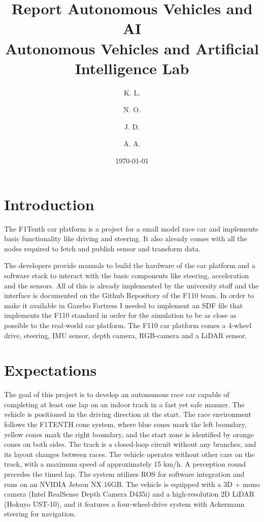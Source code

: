 \documentclass[a4paper,11pt]{article}
\title{Report Autonomous Vehicles and AI\\[1ex]
%
\large Autonomous Vehicles and Artificial Intelligence Lab}
\author{
    K. L. \\
    \and
    N. O. \\
    \and
    J. D. \\
    \and
    A. A.
}
\date{\today}
\begin{document}
\maketitle

\section{Introduction}

The F1Tenth car platform is a project for a small model race car and implements basic functionality like driving and steering. 
It also already comes with all the nodes required to fetch and publish sensor and transform data.

The developers provide manuals to build the hardware of the car platform and a software stack to interact with the basic components like steering, acceleration and the sensors. All of this is already implemented by the university staff and the interface is documented on the Github Repository of the F110 team.
In order to make it available in Gazebo Fortress I needed to implement an SDF file that implements the F110 standard in order for the simulation to be as close as possible to the real-world car platform.
The F110 car platform comes a 4-wheel drive, steering, IMU sensor, depth camera, RGB-camera and a LiDAR sensor.

\section{Expectations}

The goal of this project is to develop an autonomous race car capable of completing at least one lap on an indoor track in a fast yet safe manner. The vehicle is positioned in the driving direction at the start. The race environment follows the F1TENTH cone system, where blue cones mark the left boundary, yellow cones mark the right boundary, and the start zone is identified by orange cones on both sides. The track is a closed-loop circuit without any branches, and its layout changes between races. The vehicle operates without other cars on the track, with a maximum speed of approximately 15 km/h. A perception round precedes the timed lap. The system utilizes ROS for software integration and runs on an NVIDIA Jetson NX 16GB. The vehicle is equipped with a 3D + mono camera (Intel RealSense Depth Camera D435i) and a high-resolution 2D LiDAR (Hokuyo UST-10), and it features a four-wheel-drive system with Ackermann steering for navigation.
\end{document}

